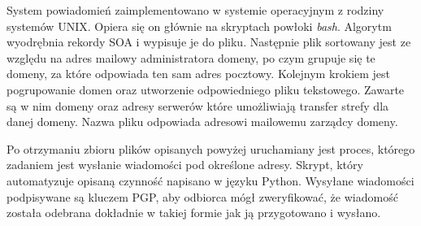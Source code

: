 System powiadomień zaimplementowano w systemie operacyjnym z rodziny systemów UNIX. Opiera się on głównie na skryptach powłoki
\textit{bash}. Algorytm wyodrębnia rekordy SOA i wypisuje je do pliku. Następnie plik sortowany jest ze względu na adres mailowy
administratora domeny, po czym grupuje się te domeny, za które odpowiada ten sam adres pocztowy. Kolejnym krokiem jest pogrupowanie
domen oraz utworzenie odpowiedniego pliku tekstowego. Zawarte są w nim domeny oraz adresy serwerów które umożliwiają transfer
strefy dla danej domeny. Nazwa pliku odpowiada adresowi mailowemu zarządcy domeny.

Po otrzymaniu zbioru plików opisanych powyżej uruchamiany jest proces, którego zadaniem jest wysłanie wiadomości pod określone
adresy. Skrypt, który automatyzuje opisaną czynność napisano w języku Python\cite{python}. Wysyłane wiadomości podpisywane są
kluczem PGP\cite{RFC4880}, aby odbiorca mógł zweryfikować, że wiadomość została odebrana dokładnie w takiej formie jak ją przygotowano
i wysłano.
